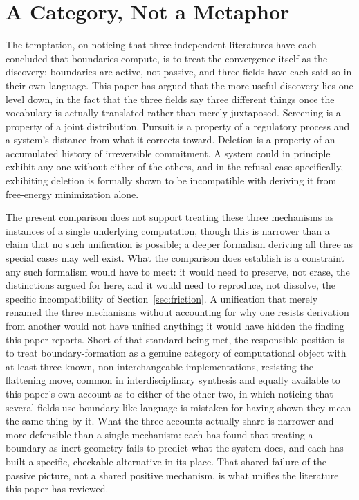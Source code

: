 \documentclass[11pt]{article}
\theoremstyle{plain}
\begin{document}
\section{A Category, Not a Metaphor}
\label{sec:conclusion}

The temptation, on noticing that three independent literatures have each concluded that boundaries compute, is to treat the convergence itself as the discovery: boundaries are active, not passive, and three fields have each said so in their own language. This paper has argued that the more useful discovery lies one level down, in the fact that the three fields say three different things once the vocabulary is actually translated rather than merely juxtaposed. Screening is a property of a joint distribution. Pursuit is a property of a regulatory process and a system's distance from what it corrects toward. Deletion is a property of an accumulated history of irreversible commitment. A system could in principle exhibit any one without either of the others, and in the refusal case specifically, exhibiting deletion is formally shown to be incompatible with deriving it from free-energy minimization alone.

The present comparison does not support treating these three mechanisms as instances of a single underlying computation, though this is narrower than a claim that no such unification is possible; a deeper formalism deriving all three as special cases may well exist. What the comparison does establish is a constraint any such formalism would have to meet: it would need to preserve, not erase, the distinctions argued for here, and it would need to reproduce, not dissolve, the specific incompatibility of Section~\ref{sec:friction}. A unification that merely renamed the three mechanisms without accounting for why one resists derivation from another would not have unified anything; it would have hidden the finding this paper reports. Short of that standard being met, the responsible position is to treat boundary-formation as a genuine category of computational object with at least three known, non-interchangeable implementations, resisting the flattening move, common in interdisciplinary synthesis and equally available to this paper's own account as to either of the other two, in which noticing that several fields use boundary-like language is mistaken for having shown they mean the same thing by it. What the three accounts actually share is narrower and more defensible than a single mechanism: each has found that treating a boundary as inert geometry fails to predict what the system does, and each has built a specific, checkable alternative in its place. That shared failure of the passive picture, not a shared positive mechanism, is what unifies the literature this paper has reviewed.
\end{document}
